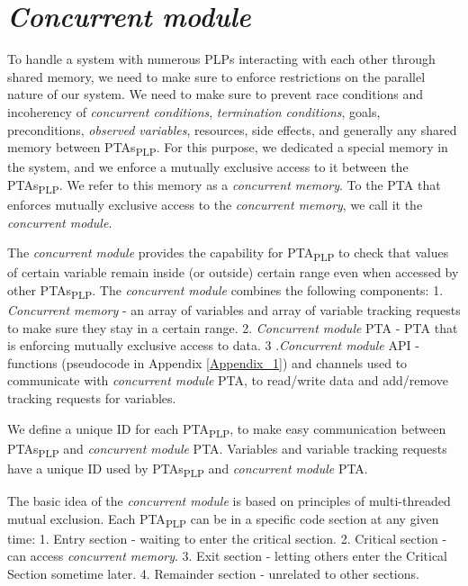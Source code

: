 \section{\textit{Concurrent module} \label{section_concurrent_module}}
To handle a system with numerous PLPs interacting with each other through shared memory, we need to make sure to enforce restrictions on the parallel nature of our system. We need to make sure to prevent race conditions and incoherency of \textit{concurrent conditions}, \textit{termination conditions}, goals, preconditions, \textit{observed variables}, resources, side effects, and generally any shared memory between PTAs\textsubscript{PLP}. For this purpose, we dedicated a special memory in the system, and we enforce a mutually exclusive access to it between the PTAs\textsubscript{PLP}. We refer to this memory as a \textit{concurrent memory}. To the PTA that enforces mutually exclusive access to the \textit{concurrent memory}, we call it the \textit{concurrent module}.
\par The \textit{concurrent module} provides the capability for PTA\textsubscript{PLP} to check that values of certain variable remain inside (or outside) certain range even when accessed by other PTAs\textsubscript{PLP}. The \textit{concurrent module} combines the following components: 1. \textit{Concurrent memory} - an array of variables and array of variable tracking requests to make sure they stay in a certain range. 2. \textit{Concurrent module} PTA - PTA that is enforcing mutually exclusive access to data. 3 .\textit{Concurrent module} API - functions (pseudocode in Appendix \ref{Appendix_1}) and channels used to communicate with \textit{concurrent module} PTA, to read/write data and add/remove tracking requests for variables.
\par We define a unique ID for each PTA\textsubscript{PLP}, to make easy communication between PTAs\textsubscript{PLP} and \textit{concurrent module} PTA. Variables and variable tracking requests have a unique ID used by PTAs\textsubscript{PLP} and \textit{concurrent module} PTA.
\par The basic idea of the \textit{concurrent module} is based on principles of multi-threaded mutual exclusion. Each PTA\textsubscript{PLP} can be in a specific code section at any given time: 1. Entry section - waiting to enter the critical section. 2. Critical section - can access \textit{concurrent memory}. 3. Exit section - letting others enter the Critical Section sometime later. 4. Remainder section - unrelated to other sections.\\
